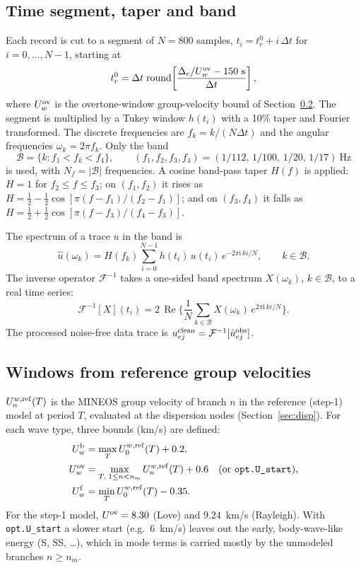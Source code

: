 \documentclass[11pt]{article}
\newcommand{\ii}{\mathrm{i}}
\newcommand{\Ifft}{\mathcal{F}^{-1}}
\newcommand{\Real}{\operatorname{Re}}
\begin{document}
\subsection{Time segment, taper and band}\label{sec:proc}
Each record is cut to a segment of $N=800$ samples, $t_i=t^0_r+i\,\Delta t$
for $i=0,\dots,N-1$, starting at
\begin{equation}
 t^0_r=\Delta t\;\mathrm{round}\!\left[\frac{\Delta_e/U^{\rm ov}_w-150~\text{s}}{\Delta t}\right],
\end{equation}
where $U^{\rm ov}_w$ is the overtone-window group-velocity bound of
Section~\ref{sec:windows}. The segment is multiplied by a Tukey window
$h(t_i)$ with a 10\% taper and Fourier transformed. The discrete
frequencies are $f_k=k/(N\Delta t)$ and the angular frequencies
$\omega_k=2\pi f_k$. Only the band
\begin{equation}
 \mathcal{B}=\{k: f_1<f_k<f_4\},\qquad (f_1,f_2,f_3,f_4)=(1/112,\,1/100,\,1/20,\,1/17)~\text{Hz}
\end{equation}
is used, with $N_f=|\mathcal{B}|$ frequencies. A cosine band-pass taper
$H(f)$ is applied: $H=1$ for $f_2\le f\le f_3$; on $(f_1,f_2)$ it rises as
$H=\tfrac12-\tfrac12\cos[\pi(f-f_1)/(f_2-f_1)]$; and on $(f_3,f_4)$ it
falls as $H=\tfrac12+\tfrac12\cos[\pi(f-f_3)/(f_4-f_3)]$.

The spectrum of a trace $u$ in the band is
\begin{equation}
  \hat u(\omega_k)=H(f_k)\sum_{i=0}^{N-1}h(t_i)\,u(t_i)\,e^{-2\pi\ii\,ki/N},\qquad k\in\mathcal{B}.
\end{equation}
The inverse operator $\Ifft$ takes a one-sided band spectrum $X(\omega_k)$,
$k\in\mathcal{B}$, to a real time series:
\begin{equation}\label{eq:ifft}
  \Ifft[X](t_i)=2\,\Real\Big\{\frac1N\sum_{k\in\mathcal{B}}X(\omega_k)\,e^{2\pi\ii\,ki/N}\Big\}.
\end{equation}
The processed noise-free data trace is $u^{\rm clean}_{ej}=\Ifft[\hat u^{\rm obs}_{ej}]$.

\subsection{Windows from reference group velocities}\label{sec:windows}
$U_{n}^{w,\rm ref}(T)$ is the MINEOS group velocity of branch $n$ in the
reference (step-1) model at period $T$, evaluated at the dispersion nodes
(Section~\ref{sec:disp}). For each wave type, three bounds (km/s) are
defined:
\begin{align}
  U^{\rm b}_w &= \max_T U^{w,\rm ref}_0(T)+0.2, \\
  U^{\rm ov}_w &= \max_{T,\;1\le n<n_m} U^{w,\rm ref}_n(T)+0.6\quad\text{(or \texttt{opt.U\_start})}, \\
  U^{\rm f}_w &= \min_T U^{w,\rm ref}_0(T)-0.35 .
\end{align}
For the step-1 model, $U^{\rm ov}=8.30$ (Love) and $9.24$~km/s (Rayleigh).
With \texttt{opt.U\_start} a slower start (e.g.\ 6~km/s) leaves out the
early, body-wave-like energy (S, SS, \dots), which in mode terms is
carried mostly by the unmodeled branches $n\ge n_m$.
\end{document}
